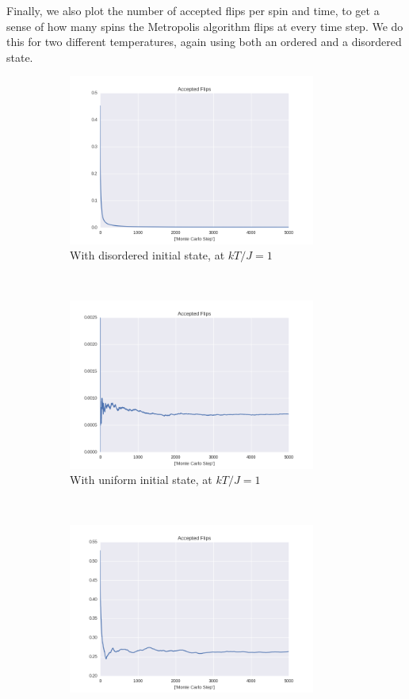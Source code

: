 \documentclass[a4paper, 10pt]{article}
\begin{document}
Finally, we also plot the number of accepted flips per spin and time, to get a sense of how many spins the Metropolis algorithm flips at every time step. We do this for two different temperatures, again using both an ordered and a disordered state.
\clearpage
\begin{figure}[!ht]
    \centering
    \begin{subfigure}[H!]{0.5\textwidth}
        \centering
        \includegraphics[height=2.2in]{flipsWRandomStart.png}
        \caption{With disordered initial state, at $kT/J=1$}
    \end{subfigure}%
    ~ 
    \begin{subfigure}[H!]{0.5\textwidth}
        \centering
        \includegraphics[height=2.2in]{flipsWUpStart.png}
        \caption{With uniform initial state, at $kT/J=1$}
    \end{subfigure}
        ~
     \begin{subfigure}[H!]{0.5\textwidth}
        \centering
        \includegraphics[height=2.2in]{flipsWRandomStartT24.png}

\end{subfigure}
\end{figure}
\end{document}
